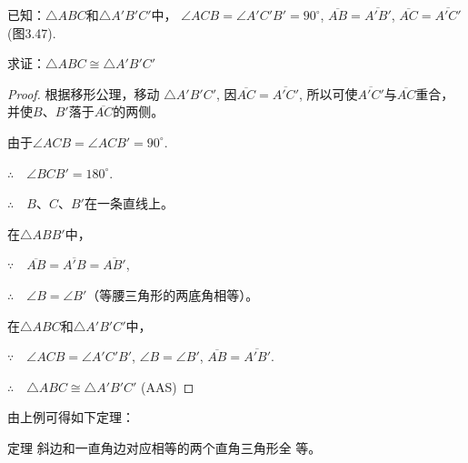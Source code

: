 \begin{example}
    已知：$\triangle ABC$和$\triangle A'B'C'$中，
$\angle ACB=\angle A'C'B'=90^{\circ}$, $\overline{AB}=\overline{A'B'}$,
$\overline{AC}=\overline{A'C'}$ (图3.47).

求证：$\triangle ABC\cong \triangle A'B'C'$
\end{example}

\begin{proof}
    根据移形公理，移动
$\triangle A'B'C'$, 因$\overline{AC}=\overline{A'C'}$,
所以可使$\overline{A'C'}$与$\overline{AC}$重合，
并使$B$、$B'$落于$\overline{AC}$的两侧。

由于$\angle ACB=\angle ACB'=90^{\circ}$.

$\therefore\quad \angle  BCB'=180^{\circ}$.

$\therefore\quad B$、$C$、$B'$在一条直线上。

在$\triangle ABB'$中，

$\because\quad \overline{AB}=\overline{A'B}=\overline{AB'}$,

$\therefore\quad \angle B=\angle B'$（等腰三角形的两底角相等）。

在$\triangle ABC$和$\triangle A'B'C'$中，

$\because\quad \angle ACB=\angle A'C'B'$, $\angle B=\angle B'$, $\overline{AB}=\overline{A'B'}$.

$\therefore\quad \triangle ABC\cong \triangle A'B'C'$ (AAS)    
\end{proof}

由上例可得如下定理：

\begin{blk}
  {定理} 斜边和一直角边对应相等的两个直角三角形全
等。  
\end{blk}

